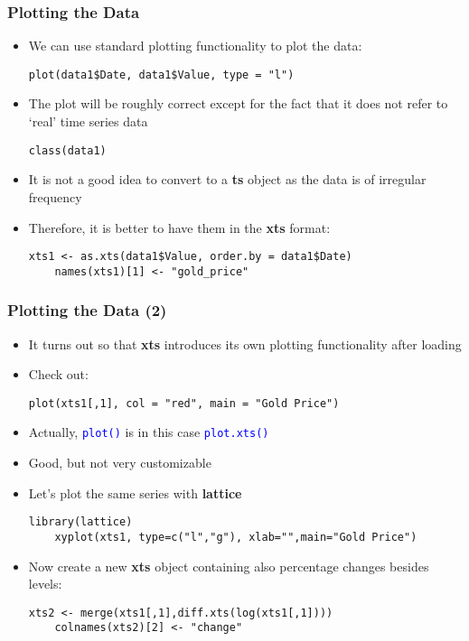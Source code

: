 \documentclass[10pt]{beamer}
\newcommand{\cc}[1]{\texttt{\textcolor{blue}{#1}}}
\theoremstyle{definition}
\begin{document}
\begin{frame}[fragile]
\frametitle{Plotting the Data}
\begin{itemize}
	\item We can use standard plotting functionality to plot the data:
	\begin{lstlisting}[style = rstyle, breaklines]
	plot(data1$Date, data1$Value, type = "l")
	\end{lstlisting}
	\item The plot will be roughly correct except for the fact that it does not refer to `real' time series data
	\begin{lstlisting}[style = rstyle, breaklines]
	class(data1)
	\end{lstlisting}
	\item It is not a good idea to convert to a \textbf{ts} object as the data is of irregular frequency
	\item Therefore, it is better to have them in the \textbf{xts} format:
	\begin{lstlisting}[style = rstyle, breaklines]
	xts1 <- as.xts(data1$Value, order.by = data1$Date)
	names(xts1)[1] <- "gold_price"
	\end{lstlisting}
\end{itemize}
\end{frame}

\begin{frame}[fragile]
\frametitle{Plotting the Data (2)}
\begin{itemize}
	\item It turns out so that \textbf{xts} introduces its own plotting functionality after loading
	\item Check out:
	\begin{lstlisting}[style = rstyle, breaklines]
	plot(xts1[,1], col = "red", main = "Gold Price")
	\end{lstlisting}
	\item Actually, \cc{plot()} is in this case \cc{plot.xts()}
	\item Good, but not very customizable
	\item Let's plot the same series with \textbf{lattice}
	\begin{lstlisting}[style = rstyle, breaklines]
	library(lattice)
	xyplot(xts1, type=c("l","g"), xlab="",main="Gold Price")
	\end{lstlisting}
	\item Now create a new \textbf{xts} object containing also percentage changes besides levels:
	\begin{lstlisting}[style = rstyle, breaklines]
	xts2 <- merge(xts1[,1],diff.xts(log(xts1[,1])))
	colnames(xts2)[2] <- "change"
	\end{lstlisting}
\end{itemize}
\end{frame}
\end{document}
